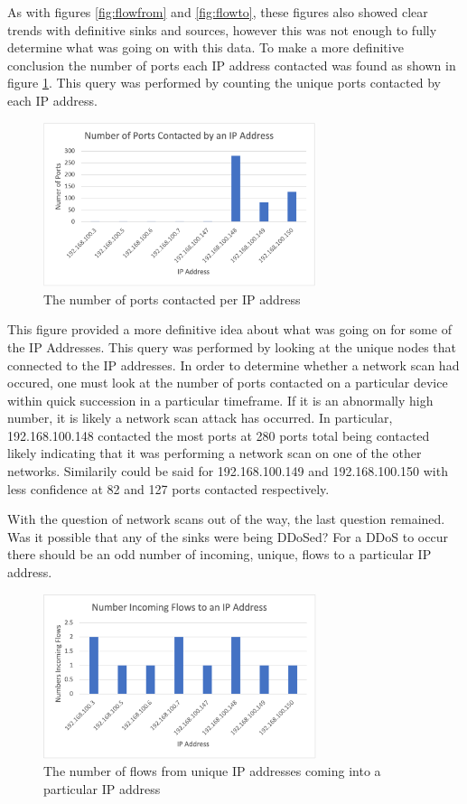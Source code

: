 \documentclass[conference]{IEEEtran}
\begin{document}
As with figures \ref{fig:flowfrom} and \ref{fig:flowto}, these figures also showed clear trends with definitive
sinks and sources, however this was not enough to fully determine what was going on with this data. To make a more
definitive conclusion the number of ports each IP address contacted was found as shown in figure 
\ref{fig:portscontacted}. This query was performed by counting the unique ports contacted by each IP address.

\begin{figure}[htbp]
    \includegraphics[width=8cm]{Figure5.png}
    \centering
    \caption{The number of ports contacted per IP address}
    \label{fig:portscontacted}
\end{figure}

This figure provided a more definitive idea about what was going on for some of the IP Addresses. This query
was performed by looking at the unique nodes that connected to the IP addresses. In order
to determine whether a network scan had occured, one must look at the number of ports contacted on a particular
device within quick succession in a particular timeframe. If it is an abnormally high number, it is likely a 
network scan attack has occurred. In particular, 192.168.100.148 contacted the most ports at 280 ports total 
being contacted likely indicating that it was performing a network scan on one of the other networks. 
Similarily could be said for 192.168.100.149 and 192.168.100.150 with less confidence at 82 and 127 ports
contacted respectively.

With the question of network scans out of the way, the last question remained.
Was it possible that any of the sinks were being DDoSed?
For a DDoS to occur there should be an odd number of incoming, unique, flows to a particular IP address. 

\begin{figure}[htbp]
    \includegraphics[width=8cm]{Figure6.png}
    \centering
    \caption{The number of flows from unique IP addresses coming into a particular IP address}
    \label{fig:incomingflows}
\end{figure}
\end{document}
